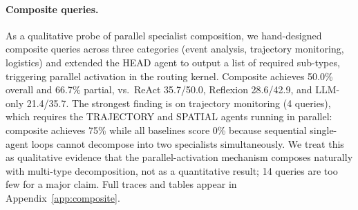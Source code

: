 \paragraph{Composite queries.}
As a qualitative probe of parallel specialist composition, we hand-designed composite queries across three categories (event analysis, trajectory monitoring, logistics) and extended the HEAD agent to output a list of required sub-types, triggering parallel activation in the routing kernel.
Composite \starname{} achieves 50.0\% overall and 66.7\% partial, vs.\ ReAct 35.7/50.0, Reflexion 28.6/42.9, and LLM-only 21.4/35.7.
The strongest finding is on trajectory monitoring (4 queries), which requires the TRAJECTORY and SPATIAL agents running in parallel: composite \starname{} achieves 75\% while all baselines score 0\% because sequential single-agent loops cannot decompose into two specialists simultaneously.
We treat this as qualitative evidence that the parallel-activation mechanism composes naturally with multi-type decomposition, not as a quantitative result; 14 queries are too few for a major claim.
Full traces and tables appear in Appendix~\ref{app:composite}.
